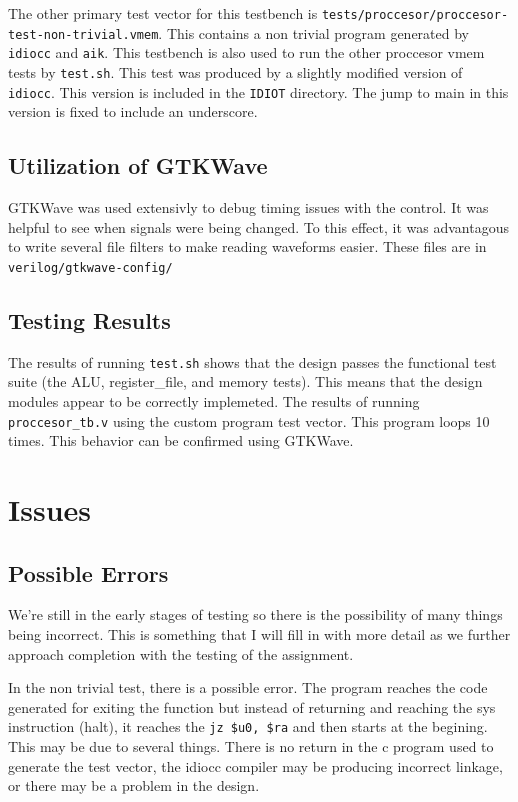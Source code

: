 \documentclass[conference]{IEEEtran}
\begin{document}
The other primary test vector for this testbench is
\texttt{tests/proccesor/proccesor-test-non-trivial.vmem}. This
contains a non trivial program generated by \texttt{idiocc} and \texttt{aik}. 
This testbench is also used to run the other proccesor vmem tests by 
\texttt{test.sh}. This test was produced by a slightly modified version of 
\texttt{idiocc}. This version is included in the \texttt{IDIOT} directory.
The jump to main in this version is fixed to include an underscore.

\subsection{Utilization of GTKWave}
GTKWave was used extensivly to debug timing issues with the control. It was 
helpful to see when signals were being changed. To this effect, it was 
advantagous to write several file filters to make reading waveforms easier.
These files are in \texttt{verilog/gtkwave-config/}

\subsection{Testing Results}
The results of running \texttt{test.sh} shows that the design passes the
functional test suite (the ALU, register\_file, and memory tests). This means
that the design modules appear to be correctly implemeted. The results of 
running \texttt{proccesor\_tb.v} using the custom program test vector. This
program loops 10 times. This behavior can be confirmed using GTKWave.

\section{Issues}
\subsection{Possible Errors}
We're still in the early stages of testing so there is the possibility of many things 
being incorrect. This is something that I will fill in with more detail as we 
further approach completion with the testing of the assignment.

In the non trivial test, there is a possible error. The program reaches the
code generated for exiting the function but instead of returning and reaching
the sys instruction (halt), it reaches the \texttt{jz \$u0, \$ra} and then
starts at the begining. This may be due to several things. There is no
return in the c program used to generate the test vector, the idiocc compiler
may be producing incorrect linkage, or there may be a problem in the design.
\end{document}
